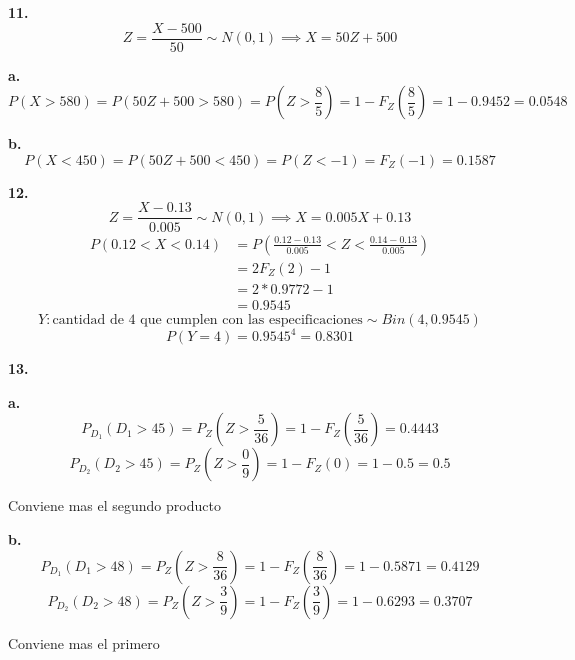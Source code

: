 \documentclass[12pt,fleqn]{article}
\begin{document}
\textbf{11.}
\[Z=\frac{X-500}{50} \sim N(0,1) \implies X=50Z+500\]

\textbf{a.}
\[P(X>580)=P(50Z+500>580)=P(Z>\frac{8}{5})=1-F_Z(\frac{8}{5})=1-0.9452=0.0548\]

\textbf{b.}
\[P(X<450)=P(50Z+500<450)=P(Z<-1)=F_Z(-1)=0.1587\]

\textbf{12.}
\[Z=\frac{X-0.13}{0.005} \sim N(0,1) \implies X=0.005X+0.13\]
\begin{align*}
  P(0.12<X<0.14)&=P(\frac{0.12-0.13}{0.005}<Z<\frac{0.14-0.13}{0.005})\\
                &=2F_Z(2)-1\tag{teorema ejercicio 10}\\
                &=2*0.9772-1\\
                &=0.9545
\end{align*}
\[Y: \textrm{cantidad de 4 que cumplen con las especificaciones} \sim Bin(4,0.9545)\]
\[P(Y=4)=0.9545^4=0.8301\]

\textbf{13.}

\textbf{a.}
\[P_{D_1}(D_1>45)=P_Z(Z>\frac{5}{36})=1-F_Z(\frac{5}{36})=0.4443\]
\[P_{D_2}(D_2>45)=P_Z(Z>\frac{0}{9})=1-F_Z(0)=1-0.5=0.5\]

Conviene mas el segundo producto

\textbf{b.}
\[P_{D_1}(D_1>48)=P_Z(Z>\frac{8}{36})=1-F_Z(\frac{8}{36})=1-0.5871=0.4129\]
\[P_{D_2}(D_2>48)=P_Z(Z>\frac{3}{9})=1-F_Z(\frac{3}{9})=1-0.6293=0.3707\]

Conviene mas el primero
\end{document}
